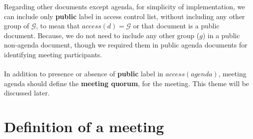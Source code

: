 \noindent
Regarding other documents except agenda, for simplicity of implementation, we can include only \textbf{public} label in access control list, without including any other group of $\mathcal{G}$, to mean that $access(d) = \mathcal{G}$ or that document is a public document. Because, we do not need to include any other group ($g$) in a public non-agenda document, though we required them in public agenda documents for identifying meeting participants.\\ \\
\noindent
In addition to presence or absence of \textbf{public} label in $access(agenda)$, meeting agenda should define the \textbf{meeting quorum}, for the meeting. This theme will be discussed later.

\section{Definition of a meeting}

